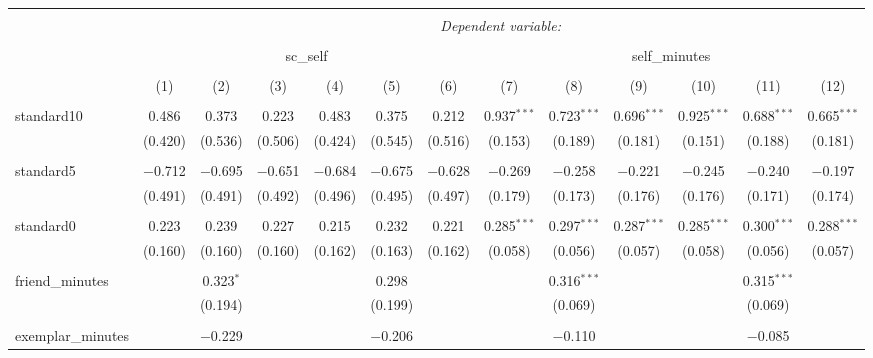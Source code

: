 
\begin{table}[!htbp] \centering 
  \caption{} 
  \label{} 
\begin{tabular}{@{\extracolsep{5pt}}lcccccccccccc} 
\\[-1.8ex]\hline 
\hline \\[-1.8ex] 
 & \multicolumn{12}{c}{\textit{Dependent variable:}} \\ 
\cline{2-13} 
\\[-1.8ex] & \multicolumn{6}{c}{sc\_self} & \multicolumn{6}{c}{self\_minutes} \\ 
\\[-1.8ex] & (1) & (2) & (3) & (4) & (5) & (6) & (7) & (8) & (9) & (10) & (11) & (12)\\ 
\hline \\[-1.8ex] 
 standard10 & 0.486 & 0.373 & 0.223 & 0.483 & 0.375 & 0.212 & 0.937$^{***}$ & 0.723$^{***}$ & 0.696$^{***}$ & 0.925$^{***}$ & 0.688$^{***}$ & 0.665$^{***}$ \\ 
  & (0.420) & (0.536) & (0.506) & (0.424) & (0.545) & (0.516) & (0.153) & (0.189) & (0.181) & (0.151) & (0.188) & (0.181) \\ 
  & & & & & & & & & & & & \\ 
 standard5 & $-$0.712 & $-$0.695 & $-$0.651 & $-$0.684 & $-$0.675 & $-$0.628 & $-$0.269 & $-$0.258 & $-$0.221 & $-$0.245 & $-$0.240 & $-$0.197 \\ 
  & (0.491) & (0.491) & (0.492) & (0.496) & (0.495) & (0.497) & (0.179) & (0.173) & (0.176) & (0.176) & (0.171) & (0.174) \\ 
  & & & & & & & & & & & & \\ 
 standard0 & 0.223 & 0.239 & 0.227 & 0.215 & 0.232 & 0.221 & 0.285$^{***}$ & 0.297$^{***}$ & 0.287$^{***}$ & 0.285$^{***}$ & 0.300$^{***}$ & 0.288$^{***}$ \\ 
  & (0.160) & (0.160) & (0.160) & (0.162) & (0.163) & (0.162) & (0.058) & (0.056) & (0.057) & (0.058) & (0.056) & (0.057) \\ 
  & & & & & & & & & & & & \\ 
 friend\_minutes &  & 0.323$^{*}$ &  &  & 0.298 &  &  & 0.316$^{***}$ &  &  & 0.315$^{***}$ &  \\ 
  &  & (0.194) &  &  & (0.199) &  &  & (0.069) &  &  & (0.069) &  \\ 
  & & & & & & & & & & & & \\ 
 exemplar\_minutes &  & $-$0.229 &  &  & $-$0.206 &  &  & $-$0.110 &  &  & $-$0.085 &  \\ 

\end{tabular}
\end{table}

